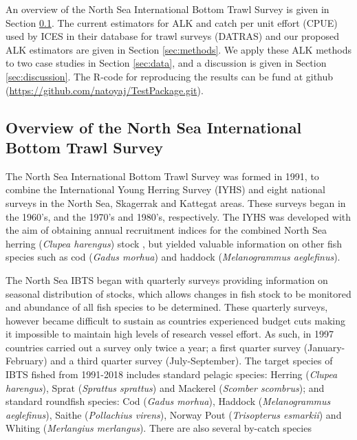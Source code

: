 \documentclass[a4paper 12pt]{article}
\numberwithin{equation}{section}
\begin{document}
 An  overview of the  North Sea International Bottom Trawl Survey is given in Section \ref{overview}. The current estimators for ALK and catch per unit effort (CPUE) used by ICES in their database for trawl surveys (DATRAS) and our proposed ALK estimators are given in Section \ref{sec:methods}. We apply these ALK methods to two case studies in Section  \ref{sec:data}, and a discussion is given in Section \ref{sec:discussion}. The R-code for reproducing the results can be fund at github (\href{https://github.com/natoyaj/TestPackage.git}{https://github.com/natoyaj/TestPackage.git}).
 

\subsection{Overview of the North Sea International Bottom Trawl Survey}
\label{overview}
\indent The North Sea International Bottom Trawl Survey was formed in 1991, to combine the International Young Herring Survey (IYHS) and eight national surveys in the North Sea, Skagerrak and Kattegat areas. These surveys began in the 1960's, and the 1970's and 1980's, respectively. The IYHS was developed with the aim of obtaining annual recruitment indices for the combined North Sea herring (\textit{Clupea harengus}) stock \citep{ICES2012}, but yielded valuable information on other fish species such as cod (\textit{Gadus morhua}) and haddock (\textit{Melanogrammus aeglefinus}).

\indent The North Sea IBTS began with quarterly surveys providing information on seasonal distribution of stocks, which allows changes in fish stock to be monitored and abundance of all fish species to be determined. These quarterly surveys, however became difficult to sustain as countries experienced budget cuts making it impossible to maintain high levels of research vessel effort. As such, in 1997 countries carried out a survey only twice a year; a first quarter survey (January-February) and a third quarter survey (July-September). The target species of IBTS fished from 1991-2018 includes standard pelagic species: Herring (\textit{Clupea harengus}), Sprat (\textit{Sprattus sprattus}) and Mackerel (\textit{Scomber scombrus}); and standard roundfish species: Cod (\textit{Gadus morhua}), Haddock (\textit{Melanogrammus aeglefinus}), Saithe (\textit{Pollachius virens}),  Norway Pout (\textit{Trisopterus esmarkii})  and Whiting (\textit{Merlangius merlangus}). There are also several by-catch species \citep{ICES2006Report}
\end{document}

